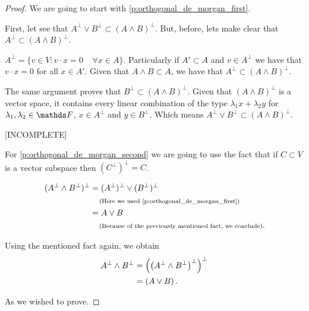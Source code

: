 \begin{proof}
    We are going to start with \eqref{p:orthogonal_de_morgan_first}.\pn
    
    First, let see that $A^\perp \vee B^\perp \subset (A \wedge B)^\perp$. But, before, lets make clear that
    $A^\perp \subset (A \wedge B)^\perp$.\pn
    
    $A^\perp = \{ v \in V : v \cdot x = 0 \;\;\;\; \forall x \in A \}$. Particularly if $A' \subset A$ and $v \in A^\perp$
    we have that $v \cdot x = 0$ for all $x \in A'$. Given that $A \wedge B \subset A$, we have that $A^\perp \subset (A \wedge B)^\perp$.\pn
    
    The same argument proves that $B^\perp \subset (A \wedge B)^\perp$. Given that $(A \wedge B)^\perp$ is a vector space,
    it contains every linear combination of the type $\lambda_1 x + \lambda_2 y$ for $\lambda_1, \lambda_2 \in \F$, $x \in A^\perp$ and
    $y \in B^\perp$. Which means $A^\perp \vee B^\perp \subset (A \wedge B)^\perp$.\pn
    
    [INCOMPLETE]\pn
    
    For \eqref{p:orthogonal_de_morgan_second} we are going to use the fact that if $C \subset V$ is a vector subspace then
    $(C^\perp)^\perp = C$.
    
    \begin{align}
        (A^\perp \wedge B^\perp)^\perp  &=  (A^\perp)^\perp \vee (B^\perp)^\perp                            \\
                                        &\;\;\;\;\mbox{{\scriptsize(Here we used \eqref{p:orthogonal_de_morgan_first})}}        \\
                                        &=  A \vee B                                                        \\
                                        &\;\;\;\;\mbox{{\scriptsize(Because of the previously mentioned fact, we conclude)}}.
    \end{align}\pn
    
    Using the mentioned fact again, we obtain
    \begin{align}
        A^\perp \wedge B^\perp      &=  \left(\left(A^\perp \wedge B^\perp\right)^\perp\right)^\perp    \\
                                    &=  \left(A \vee B\right).
    \end{align}\pn
    
    As we wished to prove.
\end{proof}